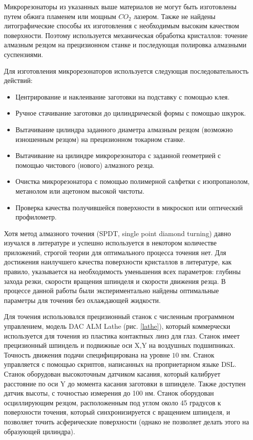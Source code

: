 Микрорезонаторы из указанных выше материалов не могут быть изготовлены путем обжига пламенем или мощным $CO_2$ лазером. Также не найдены литографические способы их изготовления с необходимым высоким качеством поверхности. Поэтому используется механическая обработка кристаллов: точение алмазным резцом на прецизионном станке и последующая полировка алмазными суспензиями.

Для изготовления микрорезонаторов используется следующая последовательность действий:

\begin{itemize}
  \item Центрирование и наклеивание заготовки на подставку с помощью клея.
  \item Ручное стачивание заготовки до цилиндрической формы с помощью шкурок.
  \item Вытачивание цилиндра заданного диаметра алмазным резцом (возможно изношенным резцом) на прецизионном токарном станке.
  \item Вытачивание на цилиндре микрорезонатора с заданной геометрией с помощью чистового (нового) алмазного резца.
  \item Очистка микрорезонатора с помощью полимерной салфетки с изопропанолом, метанолом или ацетоном высокой чистоты.
  \item Проверка качества получившейся поверхности в микроскоп или оптический профилометр.
\end{itemize}

Хотя метод алмазного точения (SPDT, single point diamond turning) давно изучался в литературе и успешно используется в некотором количестве приложений, строгой теории для оптимального процесса точения нет. Для достижения наилучшего качества поверхности кристаллов в литературе, как правило, указывается на необходимость уменьшения всех параметров: глубины захода резки, скорости вращения шпинделя и скорости движения резца. В процессе данной работы были экспериментально найдены оптимальные параметры для точения без охлаждающей жидкости.

Для точения использовался прецизионный станок с численным программном управлением, модель DAC ALM Lathe (рис. \ref{lathe}), который коммерчески используется для точения из пластика контактных линз для глаз. Станок имеет прецизионный шпиндель и подвижные оси X,Y на воздушных подшипниках. Точность движения подачи специфицирована на уровне $10$ нм. Станок управляется с помощью скриптов, написанных на проприетарном языке DSL. Станок оборудован высокоточным датчиком касания, который калибрует расстояние по оси Y до момента касания заготовки в шпинделе. Также доступен датчик высоты, с точностью измерения до 100 нм. Станок оборудован осциллирующим резцом, расположенным под углом около 45 градусов к поверхности точения, который синхронизируется с вращением шпинделя, и позволяет точить асферические поверхности (однако не позволяет делать этого на образующей цилиндра).

